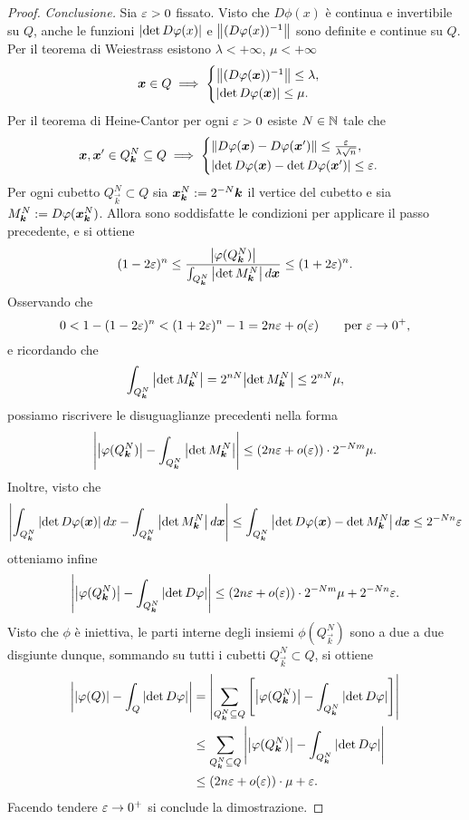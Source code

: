 \begin{proof}
\emph{Conclusione.}
Sia $\varepsilon>0$ fissato. 
Visto che $D\phi(x)$ è continua e invertibile su $Q$,
anche le funzioni ${\left|\det D\varphi(x)\right|}$ e ${\left\Vert (D\varphi(x))^{-1}\right\Vert}$
sono definite e continue su $Q$. 
Per il teorema di Weiestrass 
esistono $\lambda<+\infty$, $\mu<+\infty$ 
\[
 \boldsymbol x \in Q \implies 
 \begin{cases}
  {\left\Vert (D\varphi(\boldsymbol x))^{-1}\right\Vert} \le \lambda,\\
  {\left|\det D\varphi(\boldsymbol x)\right|} \le \mu.
 \end{cases}
\]
Per il teorema di Heine-Cantor  
per ogni $\varepsilon>0$ esiste $N\in {\mathbb N}$ tale che 
\[
 \boldsymbol x, \boldsymbol x' \in Q^N_{\boldsymbol k}\subseteq Q \implies
 \begin{cases}
  {\left\Vert D\varphi(\boldsymbol x) - D\varphi(\boldsymbol x')\right\Vert} \le \frac{\varepsilon}{\lambda \sqrt n},\\
  {\left|\det D\varphi(\boldsymbol x) - \det D\varphi(\boldsymbol x')\right|} \le \varepsilon.
 \end{cases}
\]
Per ogni cubetto $Q^N_{\vec k} \subset Q$ sia $\boldsymbol x^N_{\boldsymbol k} := 2^{-N}\boldsymbol k$ 
il vertice del cubetto e sia $M^N_{\boldsymbol k} := D\varphi(\boldsymbol x^N_{\boldsymbol k})$.
Allora sono soddisfatte le condizioni per applicare il passo precedente, e si 
ottiene 
\[
(1-2\varepsilon)^n \le \frac{{\left|\varphi(Q^N_{\boldsymbol k})\right|}}{\int_{Q^N_{\boldsymbol k}}{\left|\det M^N_{\boldsymbol k}\right|}\, d\boldsymbol x} \le (1+2\varepsilon)^n.
\]
Osservando che 
\[
 0 < 1-(1-2\varepsilon)^n < (1+2\varepsilon)^n - 1 = 2n\varepsilon + o(\varepsilon) \qquad \text{per $\varepsilon\to 0^+$},
\]
e ricordando che
\[
\int_{Q^N_{\boldsymbol k}} {\left|\det M^N_{\boldsymbol k}\right|}
= 2^{nN} {\left|\det M^N_{\boldsymbol k}\right|} \le 2^{nN} \mu,
\]
possiamo riscrivere le disuguaglianze precedenti nella forma
\[
{\left|{\left|\varphi(Q^N_{\boldsymbol k})\right|} - \int_{Q^N_{\boldsymbol k}} {\left|\det M^N_{\boldsymbol k}\right|}\right|}
\le (2n\varepsilon + o(\varepsilon))\cdot 2^{-Nm} \mu.
\]
Inoltre, visto che
\[
 {\left|\int_{Q^N_{\boldsymbol k}} {\left|\det D\varphi(\boldsymbol x)\right|}\, dx - 
 \int_{Q^N_{\boldsymbol k}} {\left|\det M^N_{\boldsymbol k}\right|}\, d\boldsymbol x\right|}
 \le \int_{Q^N_{\boldsymbol k}} {\left|\det D\varphi(\boldsymbol x) - \det M^N_{\boldsymbol k}\right|}\, d\boldsymbol x
 \le 2^{-Nn} \varepsilon
\]
otteniamo infine 
\[
{\left|{\left|\varphi(Q^N_{\boldsymbol k})\right|} - \int_{Q^N_{\boldsymbol k}} {\left|\det D\varphi\right|}\right|}
\le (2n\varepsilon + o(\varepsilon))\cdot 2^{-Nm} \mu + 2^{-Nn} \varepsilon.
\]
Visto che $\phi$ è iniettiva, 
le parti interne degli insiemi $\phi(Q^N_{\vec k})$ sono a due a due disgiunte 
dunque, sommando su tutti i cubetti $Q^N_{\vec k}\subset Q$,
si ottiene
\begin{align*}
{\left|{\left|\varphi(Q)\right|} - \int_Q {\left|\det D\varphi\right|}\right|}
&={\left|\sum_{Q^N_{\boldsymbol k}\subseteq Q} {\left[ 
  {\left|\varphi(Q^N_{\boldsymbol k})\right|} - \int_{Q^N_{\boldsymbol k}} {\left|\det D\varphi\right|} \right]}\right|} \\
&\le \sum_{Q^N_{\boldsymbol k}\subseteq Q} 
  {\left|{\left|\varphi(Q^N_{\boldsymbol k})\right|} - \int_{Q^N_{\boldsymbol k}} {\left|\det D\varphi\right|}\right|}\\
  &\le (2n\varepsilon + o(\varepsilon))\cdot \mu + \varepsilon.
\end{align*}
Facendo tendere $\varepsilon\to 0^+$ si conclude la dimostrazione.
\end{proof}


